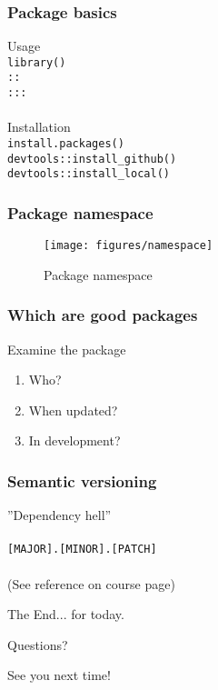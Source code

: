 \documentclass{beamer}
\begin{document}
\begin{frame}
	\frametitle{Package basics}
	\begin{center}
		Usage \\
		\texttt{library()} \\
		\texttt{::} \\
		\texttt{:::} \\~\\
		Installation \\
		\texttt{install.packages()} \\
		\texttt{devtools::install\_github()} \\
		\texttt{devtools::install\_local()} \\
	\end{center}
\end{frame}

\begin{frame}
	\frametitle{Package namespace}
	\begin{center}
			\begin{figure}[!ht]
				\texttt{[image: figures/namespace]}
				\caption{Package namespace}
				\label{fig:pkgns}
			\end{figure}
	\end{center}
\end{frame}

\begin{frame}
	\frametitle{Which are good packages}
	\centerline{Examine the package}
	\begin{center}
		\begin{enumerate}
			\item Who?			
			\item When updated?			
			\item In development?
		\end{enumerate}
	\end{center}
\end{frame}

\begin{frame}
	\frametitle{Semantic versioning}
	\begin{center}
	''Dependency hell'' \\~\\
	\texttt{[MAJOR].[MINOR].[PATCH]} \\~\\
	(See reference on course page)
	\end{center}
\end{frame}


\begin{frame}
\Huge{\centerline{The End... for today.}}
\Huge{\centerline{Questions?}}
\Huge{\centerline{See you next time!}}
\end{frame}

\end{document}
